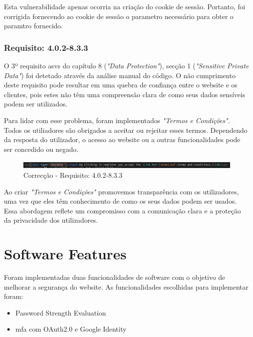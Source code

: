 Esta vulnerabilidade apenas ocorria na criação do cookie de sessão. Portanto, foi corrigida fornecendo ao cookie de sessão o parametro necessário para obter o paramtro fornecido.

\subsection*{Requisito: 4.0.2-8.3.3}

O 3º requisito \ac{asvs} do capítulo 8 (\textit{"Data Protection"}), secção 1  (\textit{"Sensitive Private Data"}) foi detetado através da análise manual do código.
O não cumprimento deste requisito pode resultar em uma quebra de confiança entre o website e os clientes, pois estes não têm uma compreensão clara de como seus dados sensíveis podem ser utilizados.

Para lidar com esse problema, foram implementados\textit{ "Termos e Condições"}. Todos os utiliadores são obrigados a aceitar ou rejeitar esses termos. Dependendo da resposta do utilizador, o acesso ao website ou a outras funcionalidades pode ser concedido ou negado.

\begin{figure}[H]
      \centering
      \includegraphics[width=14cm]{images/T&C.jpg}
      \caption{Correcção - Requisito: 4.0.2-8.3.3}
      \label{fig:T&C}
\end{figure}

Ao criar \textit{"Termos e Condições"} promovemos transparência com os utilizadores, uma vez que eles têm conhecimento de como os seus dados podem ser usados. Essa abordagem reflete um compromisso com a comunicação clara e a proteção da privacidade dos utilizadores.




%

\chapter{Software Features}
Foram implementadas duas funcionalidades de software com o objetivo de melhorar a segurança do website. As funcionalidades escolhidas para implementar foram:

\begin{itemize}
\item Password Strength Evaluation
\item \ac{mfa} com OAuth2.0 e Google Identity
\end{itemize}

